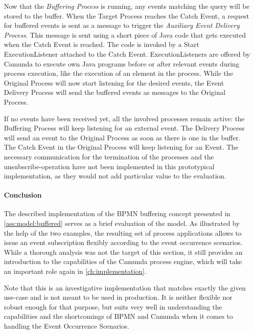 Now that the \textit{Buffering Process} is running, any events matching the query will be stored to the buffer.
When the Target Process reaches the Catch Event, a request for buffered events is sent as a message to trigger the \textit{Auxiliary Event Delivery Process}.
This message is sent using a short piece of Java code that gets executed when the Catch Event is reached. 
The code is invoked by a Start ExecutionListener attached to the Catch Event. ExecutionListeners are offered by Camunda to execute own Java programs before or after relevant events during process execution, like the execution of an element in the process.
While the Original Process will now start listening for the desired events, the Event Delivery Process will send the buffered events as messages to the Original Process.

If no events have been received yet, all the involved processes remain active: the Buffering Process will keep listening for an external event. The Delivery Process will send an event to the Original Process as soon as there is one in the buffer. The Catch Event in the Original Process will keep listening for an Event.
The necessary communication for the termination of the processes and the unsubscribe-operation have not been implemented in this prototypical implementation, as they would not add particular value to the evaluation.

\paragraph{Conclusion}
The described implementation of the BPMN buffering concept presented in \autoref{ass:model:buffered} serves as a brief evaluation of the model. As illustrated by the help of the two examples, the resulting set of process applications allows to issue an event subscription flexibly according to the event occurrence scenarios.
While a thorough analysis was not the target of this section, it still provides an introduction to the capabilities of the Camunda process engine, which will take an important role again in \ref{ch:implementation}.


Note that this is an investigative implementation that matches exactly the given use-case and is not meant to be used in production. It is neither flexible nor robust enough for that purpose, but suits very well in understanding the capabilities and the shortcomings of BPMN and Camunda when it comes to handling the Event Occurrence Scenarios.

